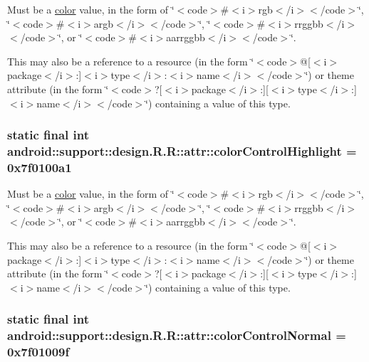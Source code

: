 Must be a \hyperlink{classandroid_1_1support_1_1design_1_1_r_1_1color}{color} value, in the form of \char`\"{}$<$code$>$\#$<$i$>$rgb$<$/i$>$$<$/code$>$\char`\"{}, \char`\"{}$<$code$>$\#$<$i$>$argb$<$/i$>$$<$/code$>$\char`\"{}, \char`\"{}$<$code$>$\#$<$i$>$rrggbb$<$/i$>$$<$/code$>$\char`\"{}, or \char`\"{}$<$code$>$\#$<$i$>$aarrggbb$<$/i$>$$<$/code$>$\char`\"{}. 

This may also be a reference to a resource (in the form \char`\"{}$<$code$>$@\mbox{[}$<$i$>$package$<$/i$>$:\mbox{]}$<$i$>$type$<$/i$>$:$<$i$>$name$<$/i$>$$<$/code$>$\char`\"{}) or theme attribute (in the form \char`\"{}$<$code$>$?\mbox{[}$<$i$>$package$<$/i$>$:\mbox{]}\mbox{[}$<$i$>$type$<$/i$>$:\mbox{]}$<$i$>$name$<$/i$>$$<$/code$>$\char`\"{}) containing a value of this type. \hypertarget{classandroid_1_1support_1_1design_1_1_r_1_1attr_31c2059aa43538e273cac3b42dae05c8}{
\subsubsection[{colorControlHighlight}]{\setlength{\rightskip}{0pt plus 5cm}static final int android::support::design.R.R::attr::colorControlHighlight = 0x7f0100a1}}
\label{classandroid_1_1support_1_1design_1_1_r_1_1attr_31c2059aa43538e273cac3b42dae05c8}


Must be a \hyperlink{classandroid_1_1support_1_1design_1_1_r_1_1color}{color} value, in the form of \char`\"{}$<$code$>$\#$<$i$>$rgb$<$/i$>$$<$/code$>$\char`\"{}, \char`\"{}$<$code$>$\#$<$i$>$argb$<$/i$>$$<$/code$>$\char`\"{}, \char`\"{}$<$code$>$\#$<$i$>$rrggbb$<$/i$>$$<$/code$>$\char`\"{}, or \char`\"{}$<$code$>$\#$<$i$>$aarrggbb$<$/i$>$$<$/code$>$\char`\"{}. 

This may also be a reference to a resource (in the form \char`\"{}$<$code$>$@\mbox{[}$<$i$>$package$<$/i$>$:\mbox{]}$<$i$>$type$<$/i$>$:$<$i$>$name$<$/i$>$$<$/code$>$\char`\"{}) or theme attribute (in the form \char`\"{}$<$code$>$?\mbox{[}$<$i$>$package$<$/i$>$:\mbox{]}\mbox{[}$<$i$>$type$<$/i$>$:\mbox{]}$<$i$>$name$<$/i$>$$<$/code$>$\char`\"{}) containing a value of this type. \hypertarget{classandroid_1_1support_1_1design_1_1_r_1_1attr_3311602efd0ba09cc6fd3dc273f78c30}{
\subsubsection[{colorControlNormal}]{\setlength{\rightskip}{0pt plus 5cm}static final int android::support::design.R.R::attr::colorControlNormal = 0x7f01009f}}
\label{classandroid_1_1support_1_1design_1_1_r_1_1attr_3311602efd0ba09cc6fd3dc273f78c30}


